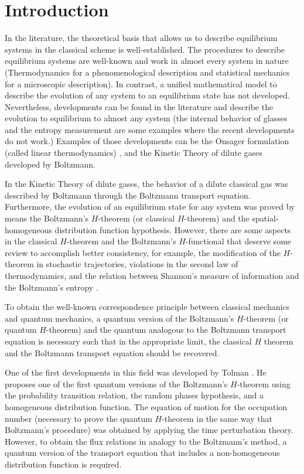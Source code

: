 \section{Introduction}

In the literature, the theoretical basis that allows us to describe equilibrium
systems in the classical scheme is well-established.
The procedures to describe
equilibrium systems are well-known and work in almost every system in nature
(Thermodynamics for a phenomenological description and statistical mechanics
for a microscopic description). In contrast, a unified mathematical model to
describe the evolution of any system to an equilibrium state has not developed.
Nevertheless, developments can be found in the literature and describe the
evolution to equilibrium to almost any system (the internal behavior of glasses
\cite{bib:zanotto2018} and the entropy measurement
\cite{bib:schmelzer2018,bib:nemilov2018} are some examples where the recent
developments do not work.) Examples of those developments can be the Onsager
formulation (called linear thermodynamics)
\cite{bib:keizer1987,bib:onsager1931}, and the Kinetic Theory of dilute gases
developed by Boltzmann.

In the Kinetic Theory of dilute gases, the behavior of a dilute classical gas
was described by Boltzmann through the Boltzmann transport equation.
Furthermore, the evolution of an equilibrium state for any system was proved by
means the Boltzmann's $H$-theorem (or classical $H$-theorem) and the
spatial-homogeneous distribution function hypothesis.
However, there are some aspects in the classical $H$-theorem and the
Boltzmann's $H$-functional that deserve some review to accomplish better
consistency, for example, the modification of the $H$-theorem in stochastic
trajectories, violations in the second law of thermodynamics, and the relation
between Shannon's measure of information and the Boltzmann's entropy %
\cite{bib:nemilov2018,bib:keizer1987,bib:onsager1931,bib:brown2008,bib:dragoljub2009}.

To obtain the well-known correspondence principle between classical mechanics
and quantum mechanics, a quantum version of the Boltzmann's $H$-theorem (or
quantum $H$-theorem) and the quantum analogous to the Boltzmann transport
equation is necessary such that in the appropriate limit, the  classical $H$
theorem and the Boltzmann transport equation should be recovered.

One of the first developments in this field was developed by Tolman
\cite{bib:tolman}. He proposes one of the first quantum versions of the
Boltzmann's $H$-theorem using the probability transition relation, the random
phases hypothesis, and a homogeneous distribution function. The equation of
motion for the occupation number (necessary to prove the quantum $H$-theorem in
the same way that Boltzmann's procedure) was obtained by applying the time
perturbation theory. However, to obtain the flux relations in analogy to the
Boltzmann's method, a quantum version of the transport equation that includes a
non-homogeneous distribution function is required.

